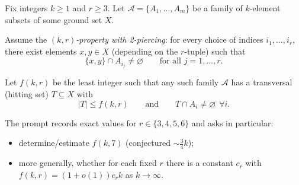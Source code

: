 Fix integers $k\ge 1$ and $r\ge 3$.  Let $\mathcal A=\{A_1,\dots,A_m\}$ be a family of $k$-element subsets of some ground set $X$.

Assume the \emph{$(k,r)$-property with 2-piercing}: for every choice of indices $i_1,\dots,i_r$, there exist elements $x,y\in X$ (depending on the $r$-tuple) such that
\[
\{x,y\}\cap A_{i_j}\neq\varnothing\qquad\text{for all } j=1,\dots,r.
\]

Let $f(k,r)$ be the least integer such that any such family $\mathcal A$ has a transversal (hitting set) $T\subseteq X$ with
\[|T|\le f(k,r)\qquad\text{and}\qquad T\cap A_i\neq\varnothing\ \ \forall i.
\]

The prompt records exact values for $r\in\{3,4,5,6\}$ and asks in particular:
\begin{itemize}
\item determine/estimate $f(k,7)$ (conjectured $\sim \tfrac34 k$);
\item more generally, whether for each fixed $r$ there is a constant $c_r$ with
$f(k,r)=(1+o(1))c_r k$ as $k\to\infty$.
\end{itemize}

